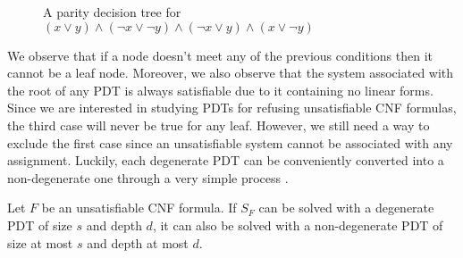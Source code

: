 \begin{figure}[H]
    \centering


    \caption{A parity decision tree for $(x \lor y) \land (\lnot x \lor \lnot y) \land (\lnot x \lor y) \land (x \lor \lnot y)$}
\end{figure}

We observe that if a node doesn't meet any of the previous conditions then it cannot be a leaf node. Moreover, we also observe that the system associated with the root of any PDT is always satisfiable due to it containing no linear forms. Since we are interested in studying PDTs for refusing unsatisfiable CNF formulas, the third case will never be true for any leaf. However, we still need a way to exclude the first case since an unsatisfiable system cannot be associated with any assignment. Luckily, each degenerate PDT can be conveniently converted into a non-degenerate one through a very simple process \cite{res_lin_2}.

\begin{proposition}
    \label{degenerate}
 Let $F$ be an unsatisfiable CNF formula. If $S_F$ can be solved with a degenerate PDT of size $s$ and depth $d$, it can also be solved with a non-degenerate PDT of size at most $s$ and depth at most $d$.
\end{proposition}

